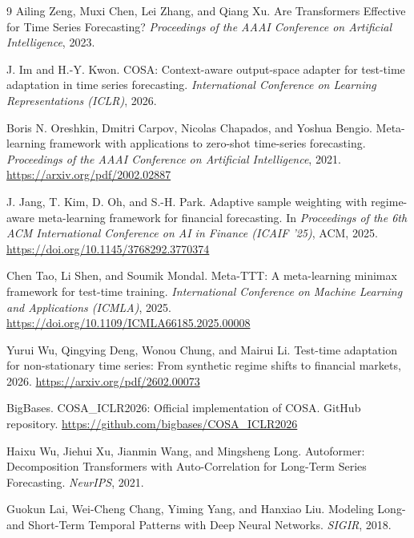 \documentclass[10pt]{article}
\begin{document}
\begin{thebibliography}{9}
Ailing Zeng, Muxi Chen, Lei Zhang, and Qiang Xu. Are Transformers Effective for Time Series Forecasting? \textit{Proceedings of the AAAI Conference on Artificial Intelligence}, 2023.

J. Im and H.-Y. Kwon. COSA: Context-aware output-space adapter for test-time adaptation in time series forecasting. \textit{International Conference on Learning Representations (ICLR)}, 2026.

Boris N. Oreshkin, Dmitri Carpov, Nicolas Chapados, and Yoshua Bengio. Meta-learning framework with applications to zero-shot time-series forecasting. \textit{Proceedings of the AAAI Conference on Artificial Intelligence}, 2021. \url{https://arxiv.org/pdf/2002.02887}

J. Jang, T. Kim, D. Oh, and S.-H. Park. Adaptive sample weighting with regime-aware meta-learning framework for financial forecasting. In \textit{Proceedings of the 6th ACM International Conference on AI in Finance (ICAIF '25)}, ACM, 2025. \url{https://doi.org/10.1145/3768292.3770374}

Chen Tao, Li Shen, and Soumik Mondal. Meta-TTT: A meta-learning minimax framework for test-time training. \textit{International Conference on Machine Learning and Applications (ICMLA)}, 2025. \url{https://doi.org/10.1109/ICMLA66185.2025.00008}

Yurui Wu, Qingying Deng, Wonou Chung, and Mairui Li. Test-time adaptation for non-stationary time series: From synthetic regime shifts to financial markets, 2026. \url{https://arxiv.org/pdf/2602.00073}

BigBases. COSA\_ICLR2026: Official implementation of COSA. GitHub repository. \url{https://github.com/bigbases/COSA_ICLR2026}

Haixu Wu, Jiehui Xu, Jianmin Wang, and Mingsheng Long. Autoformer: Decomposition Transformers with Auto-Correlation for Long-Term Series Forecasting. \textit{NeurIPS}, 2021.

Guokun Lai, Wei-Cheng Chang, Yiming Yang, and Hanxiao Liu. Modeling Long- and Short-Term Temporal Patterns with Deep Neural Networks. \textit{SIGIR}, 2018.
\end{thebibliography}
\end{document}
